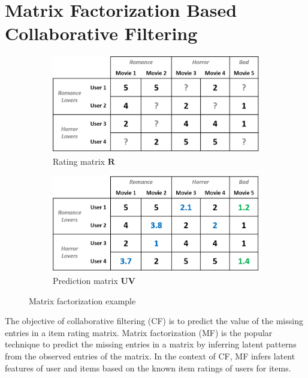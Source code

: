 \documentclass[master,english,final]{kaist-ucs}
\begin{document}
\section{Matrix Factorization Based Collaborative Filtering}
\begin{figure}[b]
    \centering
    \begin{subfigure}[b]{0.45\textwidth}
        \centering
        \includegraphics[width=\textwidth]{figure/mf_before_rating}
        \caption{Rating matrix $\bm{R}$}
        \label{mf_before_rating}
    \end{subfigure}
    \begin{subfigure}[b]{0.45\textwidth}
        \centering
        \includegraphics[width=\textwidth]{figure/mf_before_prediction}
        \caption{Prediction matrix $\bm{UV}$}
        \label{mf_before_prediction}
    \end{subfigure}
    \caption{Matrix factorization example}
    \label{mf_base}
\end{figure}
The objective of collaborative filtering (CF) is to predict the value of the missing entries in a item rating matrix.
Matrix factorization (MF) is the popular technique to predict the missing entries in a matrix by inferring latent patterns from the observed entries of the matrix.
In the context of CF, MF infers latent features of user and items based on the known item ratings of users for items.
\end{document}
